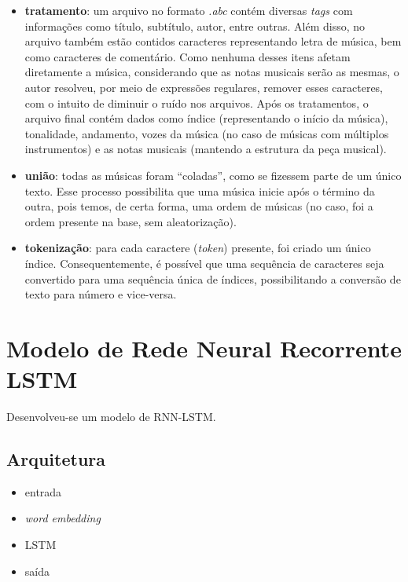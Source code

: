 \documentclass{automatextcc}
\begin{document}
\begin{itemize}
    \item \textbf{tratamento}: um arquivo no formato \textit{.abc} contém diversas \textit{tags} com informações como título, subtítulo, autor, entre outras. Além disso, no arquivo também estão contidos caracteres representando letra de música, bem como caracteres de comentário. Como nenhuma desses itens afetam diretamente a música, considerando que as notas musicais serão as mesmas, o autor resolveu, por meio de expressões regulares, remover esses caracteres, com o intuito de diminuir o ruído nos arquivos. Após os tratamentos, o arquivo final contém dados como índice (representando o início da música), tonalidade, andamento, vozes da música (no caso de músicas com múltiplos instrumentos) e as notas musicais (mantendo a estrutura da peça musical).
    \item \textbf{união}: todas as músicas foram ``coladas'', como se fizessem parte de um único texto. Esse processo possibilita que uma música inicie após o término da outra, pois temos, de certa forma, uma ordem de músicas (no caso, foi a ordem presente na base, sem aleatorização).
    \item \textbf{tokenização}: para cada caractere (\textit{token}) presente, foi criado um único índice. Consequentemente, é possível que uma sequência de caracteres seja convertido para uma sequência única de índices, possibilitando a conversão de texto para número e vice-versa.
\end{itemize}

\section{Modelo de Rede Neural Recorrente LSTM}
Desenvolveu-se um modelo de RNN-LSTM. %

\subsection{Arquitetura}

\begin{itemize}
    \item entrada 
    \item \textit{word embedding} 
    \item LSTM 
    \item saída   
\end{itemize}

\end{document}
